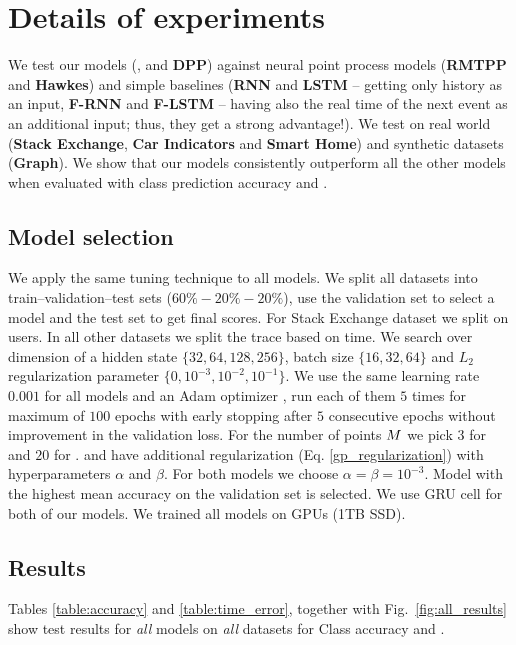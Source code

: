 \section{Details of experiments}

We test our models (\textbf{\GPModel}, \textbf{\DirModel} and \textbf{DPP}) against neural point process models (\textbf{RMTPP} and \textbf{Hawkes}) and simple baselines (\textbf{RNN} and \textbf{LSTM} -- getting only history as an input, \textbf{F-RNN} and \textbf{F-LSTM} -- having also the real time of the next event as an additional input; thus, they get a strong advantage!).
We test on real world (\textbf{Stack Exchange}, \textbf{Car Indicators} and \textbf{Smart Home}) and synthetic datasets (\textbf{Graph}). We show that our models consistently outperform all the other models when evaluated with class prediction accuracy and \TimeScore.

\subsection{Model selection}\label{model-selection}

We apply the same tuning technique to all models. We split all datasets into train--validation--test sets ($60\%-20\%-20\%$), use the validation set to select a model and the test set to get final scores. For Stack Exchange dataset we split on users. In all other datasets we split the trace based on time. We search over dimension of a hidden state $\{32,64,128,256\}$, batch size $\{16,32,64\}$ and $L_2$ regularization parameter $\{0, 10^{-3}, 10^{-2}, 10^{-1}\}$. We use the same learning rate $0.001$ for all models and an Adam optimizer \cite{Adam}, run each of them $5$ times for maximum of $100$ epochs with early stopping after $5$ consecutive epochs without improvement in the validation loss. For the number of points $M$ we pick $3$ for \GPModel and $20$ for \DirModel. \GPModel and \DirModel have additional regularization (Eq. \ref{gp_regularization}) with hyperparameters $\alpha$ and $\beta$. For both models we choose $\alpha = \beta = 10^{-3}$. Model with the highest mean accuracy on the validation set is selected. We use GRU cell \cite{GRU} for both of our models. We trained all models on GPUs (1TB SSD).

\subsection{Results}\label{detail-results}

Tables \ref{table:accuracy} and \ref{table:time_error}, together with Fig.\ \ref{fig:all_results}
show test results for \textit{all} models on \textit{all} datasets for Class accuracy and \TimeScore.


